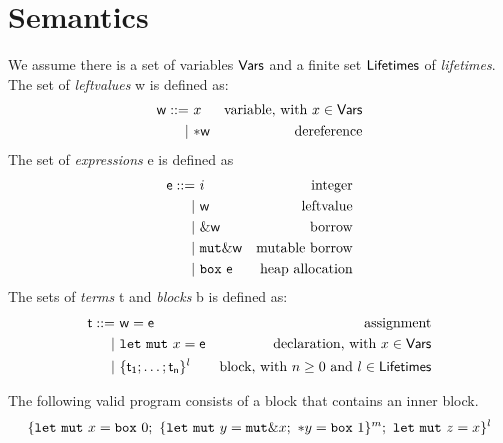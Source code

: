 \section{Semantics}\label{sec:semantics}

\begin{definition}
  We assume there is a set of variables $\mathsf{Vars}$
  and a finite set $\mathsf{Lifetimes}$ of \emph{lifetimes}.
  The set of \emph{leftvalues} \textsf{w} is defined as:
  \begin{align*}
    \mathsf{w} ::= &\ x & \text{variable, with $x\in\mathsf{Vars}$}\\
    | &\ \mathtt{*}\mathsf{w} & \text{dereference}
  \end{align*}
  The set of \emph{expressions} \textsf{e} is defined as
  \begin{align*}
    \mathsf{e} ::= &\ i & \text{integer}\\
    | &\ \mathsf{w} & \text{leftvalue}\\
    | &\ \&\mathsf{w} & \text{borrow}\\
    | &\ \mathtt{mut}\&\mathsf{w} & \text{mutable borrow}\\
    | &\ \mathtt{box}\ \mathsf{e} & \text{heap allocation}
  \end{align*}
  The sets of \emph{terms} \textsf{t} and \emph{blocks} \textsf{b}
  is defined as:
  \begin{align*}
    \mathsf{t} ::= &\ \mathsf{w}=\mathsf{e} & \text{assignment}\\
    | &\ \mathtt{let\ mut}\ x=\mathsf{e} & \text{declaration, with $x\in\mathsf{Vars}$}\\
    | &\ \{\mathsf{t_1};\ldots;\mathsf{t_n}\}^l & \text{block, with $n\ge 0$ and $l\in\mathsf{Lifetimes}$}
  \end{align*}
\end{definition}

\begin{example}\label{ex:program}
  The following valid program consists of a block that contains an inner block.
  \[
    \{
      \mathtt{let\ mut}\ x = \mathtt{box}\ 0;\
      \{\mathtt{let\ mut}\ y = \mathtt{mut}\& x;\
      \mathtt{*}y = \mathtt{box}\ 1\}^m;\
      \mathtt{let\ mut}\ z = x
    \}^l
  \]
\end{example}

